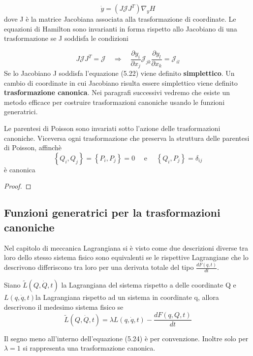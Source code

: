 \begin{equation*}
	\dot{y} = (J \mathcal{J} J^T) \nabla_yH
\end{equation*}
dove J \`{e} la matrice Jacobiana associata alla trasformazione di coordinate. Le equazioni di Hamilton sono invarianti in forma rispetto allo Jacobiano di una trasformazione se J soddisfa le condizioni

\begin{equation}
	J\mathcal{J}J^T = \mathcal{J} \quad \Rightarrow \quad \frac{\partial y_i}{\partial x_j} \mathcal{J}_{j k} \frac{\partial y_l}{\partial x_k}=\mathcal{J}_{i l}
\end{equation}
\newline
Se lo Jacobiano J soddisfa l'equazione (5.22) viene definito \textbf{simplettico}.
 Un cambio di coordinate in cui Jacobiano risulta essere simplettico viene definito \textbf{trasformazione canonica}.
 \newline 
 Nei paragrafi successivi vedremo che esiste un metodo efficace per costruire trasformazioni canoniche usando le funzioni generatrici.
\newline
\begin{theorem}
Le parentesi di Poisson sono invariati sotto l'azione delle trasformazioni canoniche. Viceversa ogni trasformazione che preserva la struttura delle parentesi di Poisson, affinch\`{e}
\begin{equation}
	\left\{Q_i, Q_j\right\}=\left\{P_i, P_j\right\}=0 \quad \text { e } \quad\left\{Q_i, P_j\right\}=\delta_{i j}
\end{equation}
\`{e} canonica
\end{theorem}

\begin{proof}
	
\end{proof}

\subsection{Funzioni generatrici per la trasformazioni canoniche}

Nel capitolo di meccanica Lagrangiana si \`{e} visto come due descrizioni diverse tra loro dello stesso sistema fisico sono equivalenti se le rispettive Lagrangiane che lo descrivono differiscono tra loro per una derivata totale del tipo $\frac{d F(q,t)}{dt}$. \newline

\begin{theorem}
	Siano $\tilde{L} (Q,\dot{Q},t)$ la Lagrangiana del sistema rispetto a delle coordinate Q e $L(q,\dot{q},t)$la Lagrangiana rispetto ad un sistema in coordinate q, allora descrivono il medesimo sistema fisico se 
	\begin{equation}
		\tilde{L} (Q,\dot{Q},t) = \lambda L(q,\dot{q},t) - \dfrac{dF(q,Q,t)}{dt}
	\end{equation}
\end{theorem}
\begin{remark}
Il segno meno all'interno dell'equazione (5.24) \`{e} per convenzione. Inoltre solo per $\lambda = 1$ si rappresenta una trasformazione canonica.
\end{remark}

